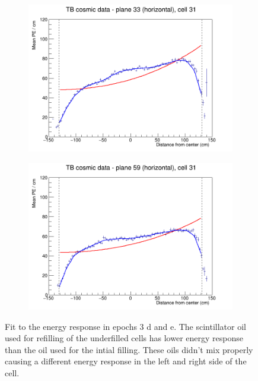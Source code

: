 \documentclass[12pt,a4paper]{article}
\begin{document}
\begin{figure}[h]
  \begin{subfigure}{0.5\textwidth}
    \includegraphics[width=\linewidth]{RelativeCalibrationResults/ep3de_033_031.png}
  \end{subfigure}
  \begin{subfigure}{0.5\textwidth}
    \includegraphics[width=\linewidth]{RelativeCalibrationResults/ep3de_059_031.png}
  \end{subfigure}
  \caption{Fit to the energy response in epochs 3 d and e. The scintillator oil used for refilling of the underfilled cells has lower energy response than the oil used for the intial filling. These oils didn't mix properly causing a different energy response in the left and right side of the cell.}
  \label{figAttenfitResultsEpoch3de_RefilledDiscrepancy}
\end{figure}
\end{document}
